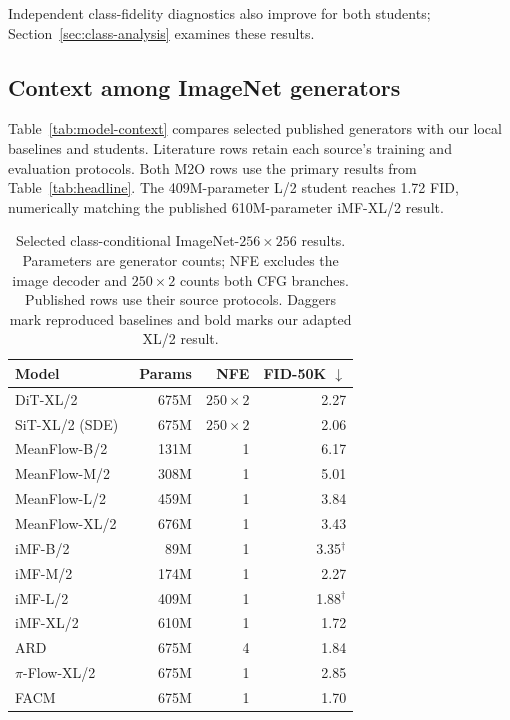 \documentclass{article}
\begin{document}
Independent class-fidelity diagnostics also improve for both students;
Section~\ref{sec:class-analysis} examines these results.

\subsection{Context among ImageNet generators}
Table~\ref{tab:model-context} compares selected published generators with
our local baselines and students. Literature rows retain each source's
training and evaluation protocols. Both M2O rows use the primary results
from Table~\ref{tab:headline}. The 409M-parameter L/2 student reaches 1.72
FID, numerically matching the published 610M-parameter iMF-XL/2 result.

\begin{table}[t]
\centering
\caption{Selected class-conditional ImageNet-$256\times256$ results.
Parameters are generator counts; NFE excludes the image decoder and
$250\times2$ counts both CFG branches. Published rows use their source
protocols. Daggers mark reproduced baselines and bold marks
our adapted XL/2 result.}
\renewcommand{\arraystretch}{0.94}
\begin{tabular}{lrrr}
\toprule
Model & Params & NFE & FID-50K $\downarrow$ \\
\midrule
DiT-XL/2~\citep{peebles2023dit} & 675M & $250\times2$ & 2.27 \\
SiT-XL/2 (SDE)~\citep{ma2024sit} & 675M & $250\times2$ & 2.06 \\
MeanFlow-B/2~\citep{geng2025meanflow} & 131M & 1 & 6.17 \\
MeanFlow-M/2~\citep{geng2025meanflow} & 308M & 1 & 5.01 \\
MeanFlow-L/2~\citep{geng2025meanflow} & 459M & 1 & 3.84 \\
MeanFlow-XL/2~\citep{geng2025meanflow} & 676M & 1 & 3.43 \\
iMF-B/2~\citep{geng2025improved} & 89M & 1 & 3.35$^{\dagger}$ \\
iMF-M/2~\citep{geng2025improved} & 174M & 1 & 2.27 \\
iMF-L/2~\citep{geng2025improved} & 409M & 1 & 1.88$^{\dagger}$ \\
iMF-XL/2~\citep{geng2025improved} & 610M & 1 & 1.72 \\
ARD~\citep{kim2025ard} & 675M & 4 & 1.84 \\
$\pi$-Flow-XL/2~\citep{chen2025piflow} & 675M & 1 & 2.85 \\
FACM~\citep{peng2025facm} & 675M & 1 & 1.70 \\

\end{tabular}
\end{table}
\end{document}
